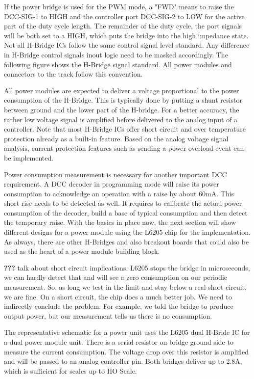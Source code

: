 If the power bridge is used for the PWM mode, a "FWD" means to raise  the DCC-SIG-1 to HIGH and the controller port DCC-SIG-2 to LOW for the active part of the duty cycle length. The remainder of the duty cycle, the port signals will be both set to a HIGH, which puts the bridge into the high impedance state. Not all H-Bridge ICs follow the same control signal level standard. Any difference in H-Bridge control signals inout logic need to be masked accordingly. The following figure shows the H-Bridge signal standard. All power modules and connectors to the track follow this convention.

All power modules are expected to deliver a voltage proportional to the power consumption of the H-Bridge. This is typically done by putting a shunt resistor between ground and the lower part of the H-bridge. For a better accuracy, the rather low voltage signal is amplified before delivered to the analog input of a controller. Note that most H-Bridge ICs offer short circuit and over temperature protection already as a built-in feature. Based on the analog voltage signal analysis, current protection features such as sending a power overload event can be implemented.

Power consumption measurement is necessary for another important DCC requirement. A DCC decoder in programming mode will raise its power consumption to acknowledge an operation with a raise by about 60mA. This short rise needs to be detected as well. It requires to calibrate the actual power consumption of the decoder, build a base of typical consumption and then detect the temporary raise. With the basics in place now, the next section will show different designs for a power module using the L6205 chip for the implementation. As always, there are other H-Bridges and also breakout boards that could also be used as the heart of a power module building block.

\textbf{???} talk about short circuit implications. L6205 stops the bridge in microseconds, we can hardly detect that and will see a zero consumption on our periodic measurement. So, as long we test in the limit and stay below a real short circuit, we are fine. On a short circuit, the chip does a much better job. We need to indirectly conclude the problem. For example, we told the bridge to produce output power, but our measurement tells us there is no consumption. 


The representative schematic for a power unit uses the L6205 dual H-Bride IC for a dual power module unit. There is a serial resistor on bridge ground side to measure the current consumption. The voltage drop over this resistor is amplified and will be passed to an analog controller pin. Both bridges deliver up to 2.8A, which is sufficient for scales up to HO Scale.


